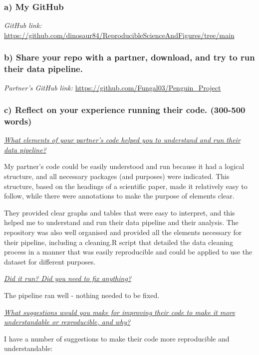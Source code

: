\documentclass[
]{article}
\begin{document}
\subsubsection{a) My GitHub}\label{a-my-github}

\emph{GitHub link:}
\url{https://github.com/dinosaur84/ReproducibleScienceAndFigures/tree/main}

\subsubsection{b) Share your repo with a partner, download, and try to
run their data
pipeline.}\label{b-share-your-repo-with-a-partner-download-and-try-to-run-their-data-pipeline.}

\emph{Partner's GitHub link:}
\url{https://github.com/Fungal03/Penguin_Project}

\subsubsection{c) Reflect on your experience running their code.
(300-500
words)}\label{c-reflect-on-your-experience-running-their-code.-300-500-words}

\ul{\emph{What elements of your partner's code helped you to understand
and run their data pipeline?}}

My partner's code could be easily understood and run because it had a
logical structure, and all necessary packages (and purposes) were
indicated. This structure, based on the headings of a scientific paper,
made it relatively easy to follow, while there were annotations to make
the purpose of elements clear.

They provided clear graphs and tables that were easy to interpret, and
this helped me to understand and run their data pipeline and their
analysis. The repository was also well organised and provided all the
elements necessary for their pipeline, including a cleaning.R script
that detailed the data cleaning process in a manner that was easily
reproducible and could be applied to use the dataset for different
purposes.

\ul{\emph{Did it run? Did you need to fix anything?}}

The pipeline ran well - nothing needed to be fixed.

\ul{\emph{What suggestions would you make for improving their code to
make it more understandable or reproducible, and why?}}

I have a number of suggestions to make their code more reproducible and
understandable:
\end{document}
